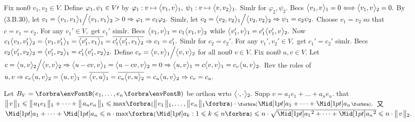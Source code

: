 Fix non0 $v_1,v_2\in V.$ Define $\varphi_1,\psi_1\in V\prime$ by $\varphi_1:v\mapsto\big\langle{}v_1,v{}\big\rangle{_1},\;\psi_1:v\mapsto\big\langle{}v,v_2{}\big\rangle{_1}.$ Simlr for $\varphi_2,\psi_2.$\parSol{}
Becs $\big\langle{}v_1,v{}\big\rangle{_1}=0\Longleftrightarrow\big\langle{}v_1,v{}\big\rangle{_2}=0.$ By (3.B.30), let $c_1=\big\langle{}v_1,v_1{}\big\rangle{_1}\Big/\big\langle{}v_1,v_1{}\big\rangle{_2}>0\Rightarrow\varphi_1=c_1\varphi_2.$\parSol{}
Simlr, let $c_2=\big\langle{}v_2,v_2{}\big\rangle{_1}\Big/\big\langle{}v_2,v_2{}\big\rangle{_2}\Rightarrow\psi_1=c_2\psi_2.$ Choose $v_1=v_2$ so that $c=c_1=c_2.$\vspace{3pt}\parSol{}
For any $v_1'\in V,$ get $c_1'$ simlr. Becs $\big\langle{}v_1,v{}\big\rangle{_1}=c_1\big\langle{}v_1,v{}\big\rangle{_2}$ while $\big\langle{}v_1',v{}\big\rangle{_1}=c_1'\big\langle{}v_1',v{}\big\rangle{_2}.$\vspace{1pt}\parSol{}
Now $c_1\big\langle{}v_1,v_1'{}\big\rangle{_2}=\big\langle{}v_1,v_1'{}\big\rangle{_1}=\overline{\big\langle{}v_1',v_1{}\big\rangle{_1}}=\overline{c_1'\big\langle{}v_1',v_1{}\big\rangle{_2}}\Rightarrow c_1=c_1'.$ Simlr for $c_2=c_2'.$\vspace{3pt}\parSol{}
\Or For any $v_1',v_2'\in V,$ get $c_1'=c_2'$ simlr. Becs $c_2\big\langle{}v_1',v_2{}\big\rangle{_2}=\big\langle{}v_1',v_2{}\big\rangle{_1}=c_1'\big\langle{}v_1',v_2{}\big\rangle{_2}.$\PfEnd\vspace{6pt}\parSol{}
\Or Define $c_v=\big\langle{}v,v{}\big\rangle{_1}\Big/\big\langle{}v,v{}\big\rangle{_2}$ for all non0 $v\in V.$ Fix non0 $u,v\in V.$\parSol{}
Let $c=\big\langle{}u,v{}\big\rangle{_2}\Big/\big\langle{}v,v{}\big\rangle{_2}\Rightarrow\big\langle{}u-cv,v{}\big\rangle{_1}=\big\langle{}u-cv,v{}\big\rangle{_2}=0\Rightarrow\big\langle{}u,v{}\big\rangle{_1}=c\big\langle{}v,v{}\big\rangle{_1}=c_v\big\langle{}u,v{}\big\rangle{_2}.$\vspace{1pt}\parSol{}
Rev the roles of $u,v\Rightarrow c_v\big\langle{}u,v{}\big\rangle{_2}={\big\langle{}u,v{}\big\rangle{_1}}=\overline{\big\langle{}v,u{}\big\rangle{_1}}=\overline{c_u\big\langle{}v,u{}\big\rangle{_2}}=c_u\big\langle{}u,v{}\big\rangle{_2}\Rightarrow c_v=c_u.$\PfEnd
\SepLine\pagebreak

Let $B_V=\Par{e_1,\dots,e_n}$ be orthon wrto $\big\langle{}\cdot,\cdot{}\big\rangle{_2}.$ Supp $v=a_1e_1+\dots+a_ne_n.$\vspace{1pt}\parSol{}
\NOTICE that $\Dvert{v}{_1}\leqslant\Dvert{a_1e_1}{_1}+\dots+\Dvert{a_ne_n}{_1}\leqslant\max\!\Bra{\Dvert{e_1}{_1},\dots,\Dvert{e_n}{_1}}\cdot\BigPar{\aMid{a_1}+\dots+\aMid{a_n}}.$\vspace{3pt}\parSol{}
又 $\aMid{a_1}+\dots+\aMid{a_n}\leqslant n\cdot\max\!\Bra{\aMid{a_k}:1\leqslant k\leqslant n}\leqslant n\cdot\sqrt{\aMidsq{a_1}+\dots+\aMidsq{a_n}}\leqslant n\cdot\Dvert{v}{_2}.$\PfEnd
\SepLine

